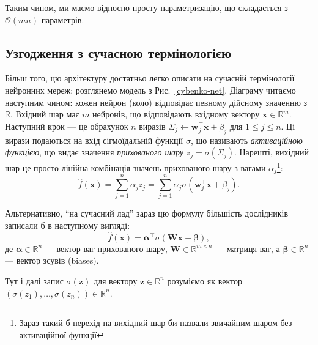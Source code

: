 Таким чином, ми маємо відносно просту параметризацію, що складається з
$\mathcal{O}(mn)$ параметрів. 

\subsection{Узгодження з сучасною термінологією}
Більш того, цю архітектуру достатньо легко описати на сучасній термінології
нейронних мереж: розглянемо модель з Рис.~\ref{cybenko-net}. Діаграму читаємо
наступним чином: кожен нейрон (коло) відповідає певному дійсному значенню з
$\mathbb{R}$. Вхідний шар має $m$ нейронів, що відповідають вхідному вектору
$\mathbf{x} \in \mathbb{R}^m$. Наступний крок --- це обрахунок $n$ виразів
$\Sigma_j \gets \boldsymbol{w}_j^{\top}\mathbf{x}+\beta_j$ для $1 \leq j \leq
n$. Ці вирази подаються на вхід сігмоїдальній функції $\sigma$, що називають
\textit{активаційною функцією}, що видає значення \textit{прихованого шару} $z_j
= \sigma(\Sigma_j)$. Нарешті, вихідний шар це просто лінійна комбінація значень
прихованого шару з вагами $\alpha_j$\footnote{Зараз такий б перехід на вихідний
шар би назвали звичайним шаром без активаційної функції}:
\begin{equation*}
	\widehat{f}(\mathbf{x}) = \sum_{j=1}^n \alpha_j z_j = \sum_{j=1}^n \alpha_j \sigma(\boldsymbol{w}_j^{\top}\mathbf{x} + \beta_j).
\end{equation*}

Альтернативно, ``на сучасний лад'' зараз цю формулу більшість дослідників записали б в наступному вигляді:
\begin{equation*}\label{eq:modern_cybenko}
	\widehat{f}(\mathbf{x}) = \boldsymbol{\alpha}^{\top}\sigma(\boldsymbol{W}\mathbf{x} + \boldsymbol{\beta}),
\end{equation*}
де $\boldsymbol{\alpha} \in \mathbb{R}^n$ --- вектор ваг прихованого шару,
$\boldsymbol{W} \in \mathbb{R}^{m \times n}$ --- матриця ваг, а
$\boldsymbol{\beta} \in \mathbb{R}^n$ --- вектор зсувів (biases). 
\begin{remark}
    Тут і далі запис $\sigma(\mathbf{z})$ для вектору $\mathbf{z} \in
    \mathbb{R}^n$ розуміємо як вектор $(\sigma(z_1),\dots,\sigma(z_n)) \in \mathbb{R}^n$.
\end{remark}

